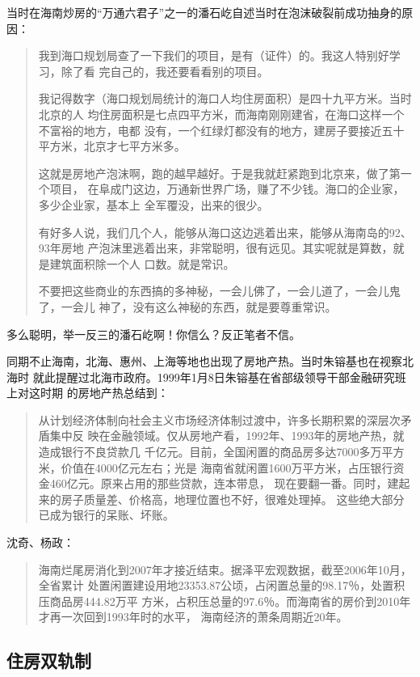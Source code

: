当时在海南炒房的“万通六君子”之一的潘石屹自述当时在泡沫破裂前成功抽身的原因：
\begin{quotation}
  我到海口规划局查了一下我们的项目，是有（证件）的。我这人特别好学习，除了看
  完自己的，我还要看看别的项目。

  我记得数字（海口规划局统计的海口人均住房面积）是四十九平方米。当时北京的人
  均住房面积是七点四平方米，而海南刚刚建省，在海口这样一个不富裕的地方，电都
  没有，一个红绿灯都没有的地方，建房子要接近五十平方米，北京才七平方米多。

  这就是房地产泡沫啊，跑的越早越好。于是我就赶紧跑到北京来，做了第一个项目，
  在阜成门这边，万通新世界广场，赚了不少钱。海口的企业家，多少企业家，基本上
  全军覆没，出来的很少。

  有好多人说，我们几个人，能够从海口这边逃着出来，能够从海南岛的92、93年房地
  产泡沫里逃着出来，非常聪明，很有远见。其实呢就是算数，就是建筑面积除一个人
  口数。就是常识。

  不要把这些商业的东西搞的多神秘，一会儿佛了，一会儿道了，一会儿鬼了，一会儿
  神了，没有这么神秘的东西，就是要尊重常识。
\end{quotation}

多么聪明，举一反三的潘石屹啊！你信么？反正笔者不信。


同期不止海南，北海、惠州、上海等地也出现了房地产热。当时朱镕基也在视察北海时
就此提醒过北海市政府。1999年1月8日朱镕基在省部级领导干部金融研究班上对这时期
的房地产热总结到：
\begin{quotation}
  从计划经济体制向社会主义市场经济体制过渡中，许多长期积累的深层次矛盾集中反
  映在金融领域。仅从房地产看，1992年、1993年的房地产热，就造成银行不良贷款几
  千亿元。目前，全国闲置的商品房多达7000多万平方米，价值在4000亿元左右；光是
  海南省就闲置1600万平方米，占压银行资金460亿元。原来占用的那些贷款，连本带息，
  现在要翻一番。同时，建起来的房子质量差、价格高，地理位置也不好，很难处理掉。
  这些绝大部分已成为银行的呆账、坏账。
\end{quotation}

沈奇、杨政：
\begin{quotation}
  海南烂尾房消化到2007年才接近结束。据泽平宏观数据，截至2006年10月，全省累计
  处置闲置建设用地23353.87公顷，占闲置总量的98.17％，处置积压商品房444.82万平
  方米，占积压总量的97.6％。而海南省的房价到2010年才再一次回到1993年时的水平，
  海南经济的萧条周期近20年。
\end{quotation}


\subsection{住房双轨制}
\label{sec:tudijnrong}


